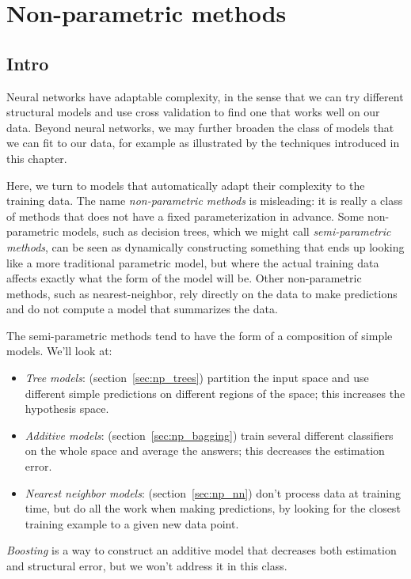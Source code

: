 \chapter{Non-parametric methods}

\section{Intro}

Neural networks have adaptable complexity, in the sense that we can
try different structural models and use cross validation to find one
that works well on our data.  Beyond neural networks, we may further
broaden the class of models that we can fit to our data, for example
as illustrated by the techniques introduced in this chapter.

Here, we turn to models that automatically adapt their complexity to
the training data.  The name {\em non-parametric methods} is
misleading: it is really a class of methods that does not have a fixed
parameterization in advance.  Some non-parametric models, such as
decision trees, which we might call {\em semi-parametric methods}, can
be seen as dynamically constructing something that ends up looking
like a more traditional parametric model, but where the actual
training data affects exactly what the form of the model will be.
Other non-parametric methods, such as nearest-neighbor, rely directly
on the data to make predictions and do not compute a model that
summarizes the data.

The semi-parametric methods tend to have the form of a composition of
simple models.  We'll look at:
\begin{itemize}
\item {\em Tree models}:  (section~\ref{sec:np_trees}) partition the input space and use
  different simple predictions on different regions of the space;
  this increases the hypothesis space.
\item {\em Additive models}:  (section~\ref{sec:np_bagging}) train several different classifiers
  on the whole space and average the answers;  this decreases 
  the estimation error.
\item{\em Nearest neighbor models}: (section~\ref{sec:np_nn}) don't
  process data at training time, but do all the work when making
  predictions, by looking for the closest training example to a given
  new data point.
\end{itemize}
{\em Boosting} is a way to construct an additive model that decreases
both estimation and structural error, but we won't
address it in this class.


